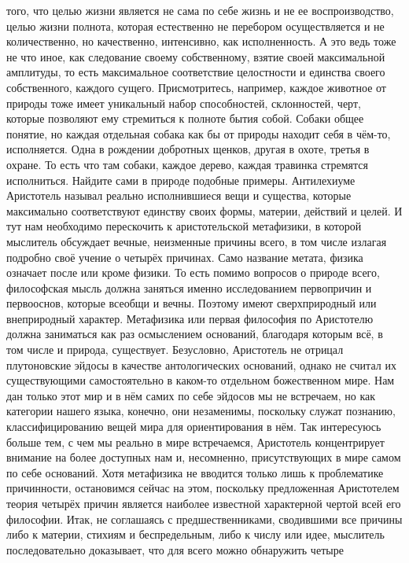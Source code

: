 того, что целью жизни является не сама по себе жизнь и не ее воспроизводство,
целью жизни полнота, которая естественно не перебором осуществляется и не
количественно, но качественно, интенсивно, как исполненность. А это ведь тоже не
что иное, как следование своему собственному, взятие своей максимальной
амплитуды, то есть максимальное соответствие целостности и единства своего
собственного, каждого сущего. Присмотритесь, например, каждое животное от
природы тоже имеет уникальный набор способностей, склонностей, черт, которые
позволяют ему стремиться к полноте бытия собой. Собаки общее понятие, но каждая
отдельная собака как бы от природы находит себя в чём-то, исполняется. Одна в
рождении добротных щенков, другая в охоте, третья в охране. То есть что там
собаки, каждое дерево, каждая травинка стремятся исполниться. Найдите сами в
природе подобные примеры. Антилехиуме Аристотель называл реально исполнившиеся
вещи и существа, которые максимально соответствуют единству своих формы,
материи, действий и целей. И тут нам необходимо перескочить к аристотельской
метафизики, в которой мыслитель обсуждает вечные, неизменные причины всего, в
том числе излагая подробно своё учение о четырёх причинах. Само название метата,
физика означает после или кроме физики. То есть помимо вопросов о природе всего,
философская мысль должна заняться именно исследованием первопричин и первооснов,
которые всеобщи и вечны. Поэтому имеют сверхприродный или внеприродный характер.
Метафизика или первая философия по Аристотелю должна заниматься как раз
осмыслением оснований, благодаря которым всё, в том числе и природа, существует.
Безусловно, Аристотель не отрицал плутоновские эйдосы в качестве антологических
оснований, однако не считал их существующими самостоятельно в каком-то отдельном
божественном мире. Нам дан только этот мир и в нём самих по себе эйдосов мы не
встречаем, но как категории нашего языка, конечно, они незаменимы, поскольку
служат познанию, классифицированию вещей мира для ориентирования в нём. Так
интересуюсь больше тем, с чем мы реально в мире встречаемся, Аристотель
концентрирует внимание на более доступных нам и, несомненно, присутствующих в
мире самом по себе оснований. Хотя метафизика не вводится только лишь к
проблематике причинности, остановимся сейчас на этом, поскольку предложенная
Аристотелем теория четырёх причин является наиболее известной характерной чертой
всей его философии. Итак, не соглашаясь с предшественниками, сводившими все
причины либо к материи, стихиям и беспредельным, либо к числу или идее,
мыслитель последовательно доказывает, что для всего можно обнаружить четыре
